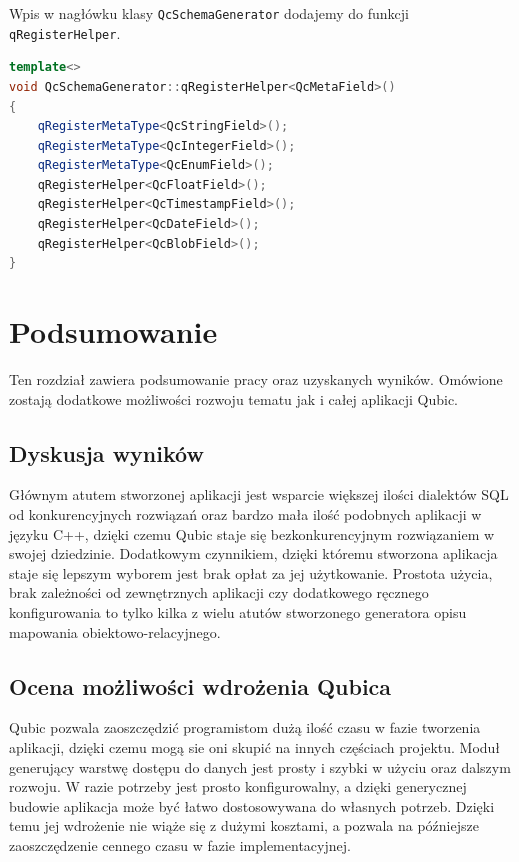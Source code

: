 \documentclass[12pt]{report}
\begin{document}
{Wpis w nagłówku klasy {\tt QcSchemaGenerator} dodajemy do funkcji \\{\tt qRegisterHelper}.

\begin{framed}
\begin{lstlisting}[language=C++]
template<>
void QcSchemaGenerator::qRegisterHelper<QcMetaField>()
{
    qRegisterMetaType<QcStringField>();
    qRegisterMetaType<QcIntegerField>();
    qRegisterMetaType<QcEnumField>();
    qRegisterHelper<QcFloatField>();
    qRegisterHelper<QcTimestampField>();
    qRegisterHelper<QcDateField>();
    qRegisterHelper<QcBlobField>();
}
\end{lstlisting}
\end{framed}

}
\chapter{Podsumowanie}
Ten rozdział zawiera podsumowanie pracy oraz uzyskanych wyników. Omówione zostają dodatkowe możliwości rozwoju tematu jak i całej aplikacji Qubic.
\section{Dyskusja wyników}
 Głównym atutem stworzonej aplikacji jest wsparcie większej ilości dialektów SQL od konkurencyjnych rozwiązań oraz bardzo mała ilość podobnych aplikacji w języku C++, dzięki czemu Qubic staje się bezkonkurencyjnym rozwiązaniem w swojej dziedzinie. Dodatkowym czynnikiem, dzięki któremu stworzona aplikacja staje się lepszym wyborem jest brak opłat za jej użytkowanie. Prostota użycia, brak zależności od zewnętrznych aplikacji czy dodatkowego ręcznego konfigurowania to tylko kilka z wielu atutów stworzonego generatora opisu mapowania obiektowo-relacyjnego.
\section{Ocena możliwości wdrożenia Qubica}
Qubic pozwala zaoszczędzić programistom dużą ilość czasu w fazie tworzenia aplikacji, dzięki czemu mogą sie oni skupić na innych częściach projektu. Moduł generujący warstwę dostępu do danych jest prosty i szybki w użyciu oraz dalszym rozwoju. W razie potrzeby jest prosto konfigurowalny, a dzięki generycznej budowie aplikacja może być łatwo dostosowywana do własnych potrzeb. Dzięki temu jej wdrożenie nie wiąże się z dużymi kosztami, a pozwala na późniejsze zaoszczędzenie cennego czasu w fazie implementacyjnej.
\end{document}
